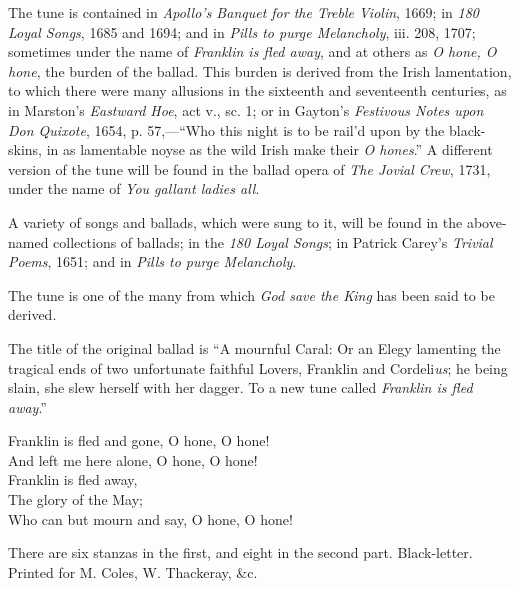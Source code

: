 The tune is contained in \textit{Apollo’s Banquet for the Treble Violin}, 1669; in
\textit{180 Loyal Songs}, 1685 and 1694; and in \textit{ Pills to purge Melancholy}, iii. 208, 1707;
sometimes under the name of \textit{Franklin is fled away}, and at others as \textit{O hone,
O hone}, the burden of the ballad. This burden is derived from the Irish lamentation, 
to which there were many allusions in the sixteenth and seventeenth
centuries, as in Marston’s \textit{Eastward Hoe}, act v., sc. 1; or in Gayton’s \textit{Festivous
Notes upon Don Quixote}, 1654, p. 57,—“Who this night is to be rail’d upon by
the black-skins, in as lamentable noyse as the wild Irish make their \textit{O hones}.”
A different version of the tune will be found in the ballad opera of \textit{The Jovial
Crew}, 1731, under the name of \textit{You gallant ladies all}.

A variety of songs and ballads, which were sung to it, will be found in the
above-named collections of ballads; in the \textit{180 Loyal Songs}; in Patrick Carey’s
\textit{Trivial Poems}, 1651; and in \textit{ Pills to purge Melancholy}.

The tune is one of the many from which \textit{God save the King} has been said to be
derived.
\pagebreak%

The title of the original ballad is “A mournful Caral: Or an Elegy lamenting
the tragical ends of two unfortunate faithful Lovers, Franklin and Cordeli\textit{us}; he
being slain, she slew herself with her dagger. To a new tune called \textit{Franklin is
fled away}.”



\settowidth{\versewidth}{Franklin is fled and gone, O hone, O hone!}
\begin{scverse}
\begin{patverse}
Franklin is fled and gone, O hone, O hone!\\
And left me here alone, O hone, O hone!\\
Franklin is fled away,\\
The glory of the May;\\
Who can but mourn and say, O hone, O hone!
\end{patverse}
\end{scverse}

There are six stanzas in the first, and eight in the second part. Black-letter.
Printed for M. Coles, W. Thackeray, \&c.

